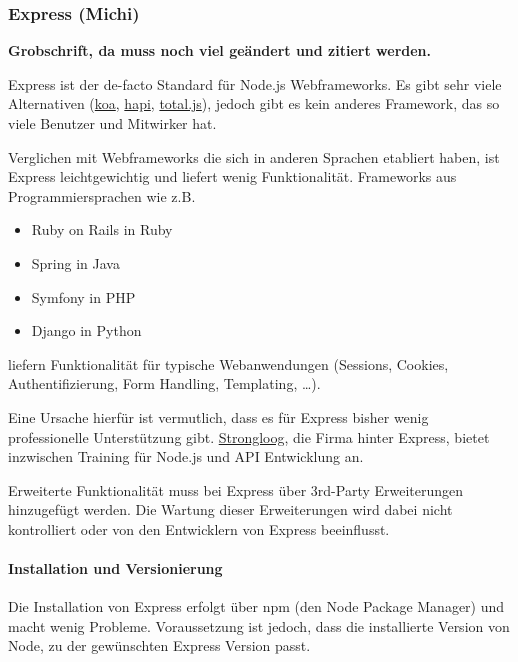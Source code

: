 \subsubsection{Express (Michi)}\label{express-michi}

\textbf{Grobschrift, da muss noch viel geändert und zitiert werden.}

Express ist der de-facto Standard für Node.js Webframeworks. Es gibt
sehr viele Alternativen (\href{http://koajs.com/}{koa},
\href{http://hapijs.com/}{hapi},
\href{https://github.com/totaljs/framework}{total.js}), jedoch gibt es
kein anderes Framework, das so viele Benutzer und Mitwirker hat.

Verglichen mit Webframeworks die sich in anderen Sprachen etabliert
haben, ist Express leichtgewichtig und liefert wenig Funktionalität.
Frameworks aus Programmiersprachen wie z.B.

\begin{itemize}
\itemsep1pt\parskip0pt
\item
  Ruby on Rails in Ruby
\item
  Spring in Java
\item
  Symfony in PHP
\item
  Django in Python
\end{itemize}

liefern Funktionalität für typische Webanwendungen (Sessions, Cookies,
Authentifizierung, Form Handling, Templating, \ldots{}).

Eine Ursache hierfür ist vermutlich, dass es für Express bisher wenig
professionelle Unterstützung gibt.
\href{https://strongloop.com/node-js/training/}{Strongloog}, die Firma
hinter Express, bietet inzwischen Training für Node.js und API
Entwicklung an.

Erweiterte Funktionalität muss bei Express über 3rd-Party Erweiterungen
hinzugefügt werden. Die Wartung dieser Erweiterungen wird dabei nicht
kontrolliert oder von den Entwicklern von Express beeinflusst.

\paragraph{Installation und
Versionierung}\label{installation-und-versionierung}

Die Installation von Express erfolgt über npm (den Node Package Manager)
und macht wenig Probleme. Voraussetzung ist jedoch, dass die
installierte Version von Node, zu der gewünschten Express Version passt.

